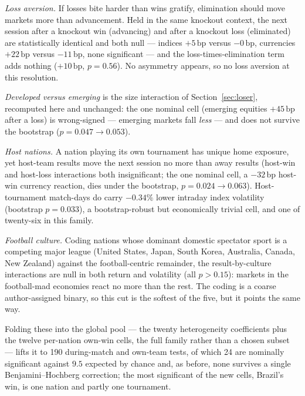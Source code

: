 \documentclass[12pt]{article}
\newcommand{\bp}{\,\text{bp}}
\begin{document}
\emph{Loss aversion.} If losses bite harder than wins gratify, elimination should move markets more than advancement. Held in the same knockout context, the next session after a knockout win (advancing) and after a knockout loss (eliminated) are statistically identical and both null --- indices $+5\bp$ versus $-0\bp$, currencies $+22\bp$ versus $-11\bp$, none significant --- and the loss-times-elimination term adds nothing ($+10\bp$, $p=0.56$). No asymmetry appears, so no loss aversion at this resolution.

\emph{Developed versus emerging} is the size interaction of Section~\ref{sec:loser}, recomputed here and unchanged: the one nominal cell (emerging equities $+45\bp$ after a loss) is wrong-signed --- emerging markets fall \emph{less} --- and does not survive the bootstrap ($p=0.047\to0.053$).

\emph{Host nations.} A nation playing its own tournament has unique home exposure, yet host-team results move the next session no more than away results (host-win and host-loss interactions both insignificant; the one nominal cell, a $-32\bp$ host-win currency reaction, dies under the bootstrap, $p=0.024\to0.063$). Host-tournament match-days do carry $-0.34\%$ lower intraday index volatility (bootstrap $p=0.033$), a bootstrap-robust but economically trivial cell, and one of twenty-six in this family.

\emph{Football culture.} Coding nations whose dominant domestic spectator sport is a competing major league (United States, Japan, South Korea, Australia, Canada, New Zealand) against the football-centric remainder, the result-by-culture interactions are null in both return and volatility (all $p>0.15$): markets in the football-mad economies react no more than the rest. The coding is a coarse author-assigned binary, so this cut is the softest of the five, but it points the same way.

Folding these into the global pool --- the twenty heterogeneity coefficients plus the twelve per-nation own-win cells, the full family rather than a chosen subset --- lifts it to 190 during-match and own-team tests, of which 24 are nominally significant against $9.5$ expected by chance and, as before, none survives a single Benjamini--Hochberg correction; the most significant of the new cells, Brazil's win, is one nation and partly one tournament.
\end{document}
